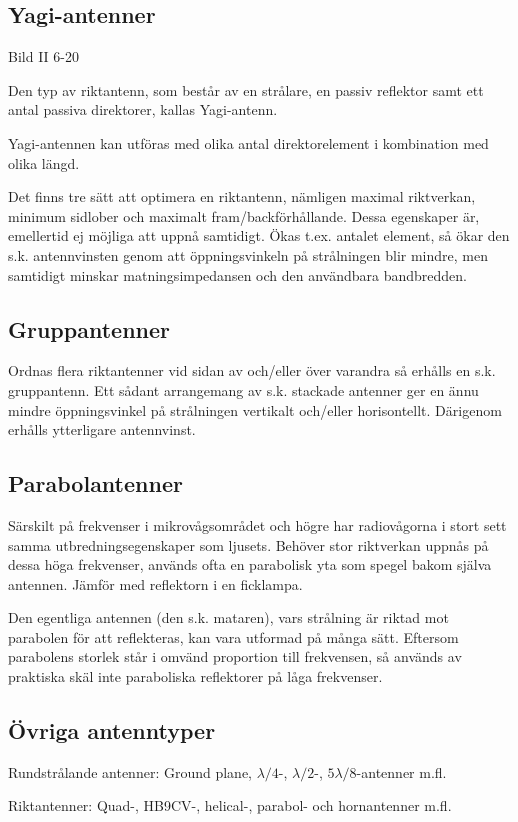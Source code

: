 \subsection{Yagi-antenner}

Bild II 6-20

Den typ av riktantenn, som består av en strålare, en passiv reflektor
samt ett antal passiva direktorer, kallas Yagi-antenn.

Yagi-antennen kan utföras med olika antal direktorelement i
kombination med olika längd.

Det finns tre sätt att optimera en riktantenn, nämligen maximal
riktverkan, minimum sidlober och maximalt fram/backförhållande. Dessa
egenskaper är, emellertid ej möjliga att uppnå samtidigt. Ökas t.ex.
antalet element, så ökar den s.k. antennvinsten genom att
öppningsvinkeln på strålningen blir mindre, men samtidigt minskar
matningsimpedansen och den användbara bandbredden.


\subsection{Gruppantenner}

Ordnas flera riktantenner vid sidan av och/eller över varandra så
erhålls en s.k. gruppantenn. Ett sådant arrangemang av s.k. stackade
antenner ger en ännu mindre öppningsvinkel på strålningen vertikalt
och/eller horisontellt. Därigenom erhålls ytterligare antennvinst.

\subsection{Parabolantenner}

Särskilt på frekvenser i mikrovågsområdet och högre har radiovågorna i
stort sett samma utbredningsegenskaper som ljusets.  Behöver stor
riktverkan uppnås på dessa höga frekvenser, används ofta en parabolisk
yta som spegel bakom själva antennen.  Jämför med reflektorn i en
ficklampa.

Den egentliga antennen (den s.k. mataren), vars strålning är riktad
mot parabolen för att reflekteras, kan vara utformad på många
sätt. Eftersom parabolens storlek står i omvänd proportion till
frekvensen, så används av praktiska skäl inte paraboliska reflektorer
på låga frekvenser.

\subsection{Övriga antenntyper}

Rundstrålande antenner: Ground plane, \(\lambda/4\)-, \(\lambda/2\)-,
\(5\lambda/8\)-antenner m.fl.

Riktantenner: Quad-, HB9CV-, helical-, parabol- och hornantenner m.fl.
